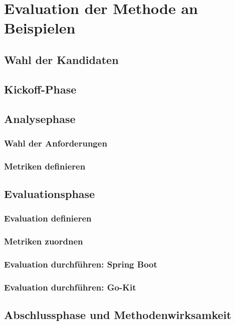 \section{Evaluation der Methode an Beispielen}
\subsection{Wahl der Kandidaten}
\subsection{Kickoff-Phase}
\subsection{Analysephase}
\subsubsection{Wahl der Anforderungen}
\subsubsection{Metriken definieren}
\subsection{Evaluationsphase}
\subsubsection{Evaluation definieren}
\subsubsection{Metriken zuordnen}
\subsubsection{Evaluation durchführen: Spring Boot}
\subsubsection{Evaluation durchführen: Go-Kit}
\subsection{Abschlussphase und Methodenwirksamkeit}

